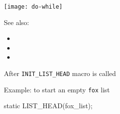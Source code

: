 \begin{center}
  \texttt{[image: do-while]}
\end{center}

See also:
\begin{itemize}
\item {}
\item {}
\item {}
\end{itemize}
  
\begin{frame}[fragile=singleslide]
  \begin{block}{After \texttt{INIT\_LIST\_HEAD} macro is called}
    \begin{center}
    \end{center}
  \end{block}
  Example: to start an empty \texttt{fox} list  
  \begin{center}
\begin{ccode}
static LIST_HEAD(fox_list);
\end{ccode}
  \end{center}
\end{frame}

